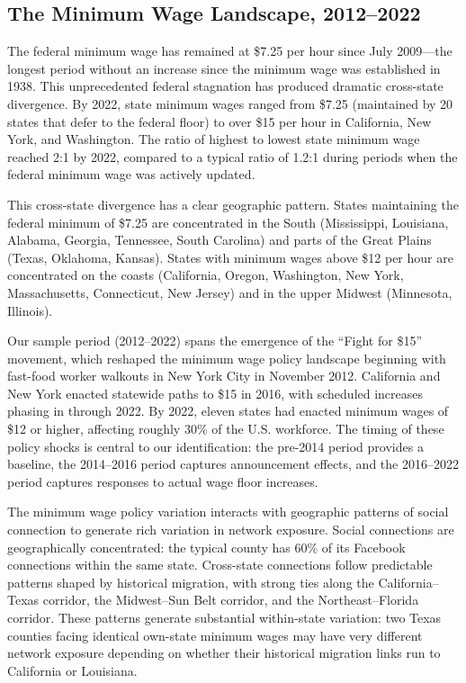 \documentclass[12pt]{article}
\begin{document}
\subsection{The Minimum Wage Landscape, 2012--2022}

The federal minimum wage has remained at \$7.25 per hour since July 2009---the longest period without an increase since the minimum wage was established in 1938. This unprecedented federal stagnation has produced dramatic cross-state divergence. By 2022, state minimum wages ranged from \$7.25 (maintained by 20 states that defer to the federal floor) to over \$15 per hour in California, New York, and Washington. The ratio of highest to lowest state minimum wage reached 2:1 by 2022, compared to a typical ratio of 1.2:1 during periods when the federal minimum wage was actively updated.

This cross-state divergence has a clear geographic pattern. States maintaining the federal minimum of \$7.25 are concentrated in the South (Mississippi, Louisiana, Alabama, Georgia, Tennessee, South Carolina) and parts of the Great Plains (Texas, Oklahoma, Kansas). States with minimum wages above \$12 per hour are concentrated on the coasts (California, Oregon, Washington, New York, Massachusetts, Connecticut, New Jersey) and in the upper Midwest (Minnesota, Illinois).

Our sample period (2012--2022) spans the emergence of the ``Fight for \$15'' movement, which reshaped the minimum wage policy landscape beginning with fast-food worker walkouts in New York City in November 2012. California and New York enacted statewide paths to \$15 in 2016, with scheduled increases phasing in through 2022. By 2022, eleven states had enacted minimum wages of \$12 or higher, affecting roughly 30\% of the U.S. workforce. The timing of these policy shocks is central to our identification: the pre-2014 period provides a baseline, the 2014--2016 period captures announcement effects, and the 2016--2022 period captures responses to actual wage floor increases.

The minimum wage policy variation interacts with geographic patterns of social connection to generate rich variation in network exposure. Social connections are geographically concentrated: the typical county has 60\% of its Facebook connections within the same state. Cross-state connections follow predictable patterns shaped by historical migration, with strong ties along the California--Texas corridor, the Midwest--Sun Belt corridor, and the Northeast--Florida corridor. These patterns generate substantial within-state variation: two Texas counties facing identical own-state minimum wages may have very different network exposure depending on whether their historical migration links run to California or Louisiana.
\end{document}
